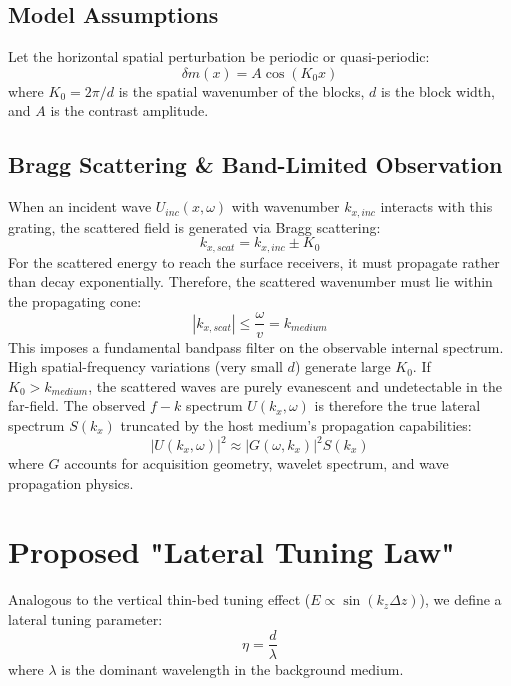 \documentclass{article}
\begin{document}
\subsection{Model Assumptions}
Let the horizontal spatial perturbation be periodic or quasi-periodic:
\begin{equation}
\delta m(x) = A \cos(K_0 x)
\end{equation}
where $K_0 = 2\pi/d$ is the spatial wavenumber of the blocks, $d$ is the block width, and $A$ is the contrast amplitude.

\subsection{Bragg Scattering \& Band-Limited Observation}
When an incident wave $U_{inc}(x, \omega)$ with wavenumber $k_{x,inc}$ interacts with this grating, the scattered field is generated via Bragg scattering:
\begin{equation}
k_{x,scat} = k_{x,inc} \pm K_0
\end{equation}
For the scattered energy to reach the surface receivers, it must propagate rather than decay exponentially. Therefore, the scattered wavenumber must lie within the propagating cone:
\begin{equation}
|k_{x,scat}| \le \frac{\omega}{v} = k_{medium}
\end{equation}
This imposes a fundamental bandpass filter on the observable internal spectrum. High spatial-frequency variations (very small $d$) generate large $K_0$. If $K_0 > k_{medium}$, the scattered waves are purely evanescent and undetectable in the far-field. The observed $f-k$ spectrum $U(k_x, \omega)$ is therefore the true lateral spectrum $S(k_x)$ truncated by the host medium's propagation capabilities:
\begin{equation}
|U(k_x, \omega)|^2 \approx |G(\omega, k_x)|^2 S(k_x)
\end{equation}
where $G$ accounts for acquisition geometry, wavelet spectrum, and wave propagation physics.

\section{Proposed "Lateral Tuning Law"}
Analogous to the vertical thin-bed tuning effect ($E \propto \sin(k_z \Delta z)$), we define a lateral tuning parameter:
\begin{equation}
\eta = \frac{d}{\lambda}
\end{equation}
where $\lambda$ is the dominant wavelength in the background medium.
\end{document}
